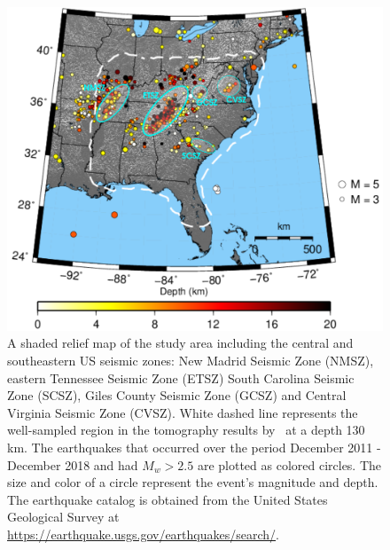 \documentclass[draft,linenumbers]{agujournal2018}
\begin{document}
\begin{figure}[h!]
    \centering
    \includegraphics[width=32pc]{figures/seismicity_new.png}
    \caption{ A shaded relief map of the study area including the central and southeastern US seismic zones: New Madrid Seismic Zone (NMSZ), eastern Tennessee  Seismic Zone (ETSZ) South Carolina Seismic Zone (SCSZ), Giles County Seismic Zone (GCSZ) and Central Virginia Seismic Zone (CVSZ). White dashed line represents the well-sampled region in the tomography results by~\citet{Biryol_2016} at a depth 130 km. The earthquakes that occurred over the period December 2011 - December 2018 and had $M_{w} > 2.5$ are plotted as colored circles. The size and color of a circle represent the event's magnitude and depth. The earthquake catalog is obtained from the United States Geological Survey at \url{https://earthquake.usgs.gov/earthquakes/search/}.}
    \label{figone}
 \end{figure}
    
\end{document}
